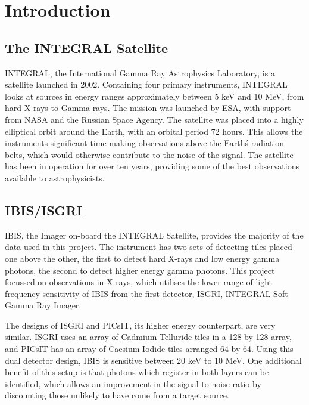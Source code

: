 
\chapter{Introduction} %

\label{ch:introduction} %


\section{The INTEGRAL Satellite}
INTEGRAL, the International Gamma Ray Astrophysics Laboratory, is a satellite launched in 2002. Containing four primary instruments, INTEGRAL looks at sources in energy ranges approximately between 5 keV and 10 MeV, from hard X-rays to Gamma rays. The mission was launched by ESA, with support from NASA and the Russian Space Agency. The satellite was placed into a highly elliptical orbit around the Earth, with an orbital period 72 hours. This allows the instruments significant time making observations above the Earth\'s radiation belts, which would otherwise contribute to the noise of the signal. The satellite has been in operation for over ten years, providing some of the best observations available to astrophysicists\cite{lamport94}.

\section{IBIS/ISGRI}
IBIS, the Imager on-board the INTEGRAL Satellite, provides the majority of the data used in this project. The instrument has two sets of detecting tiles placed one above the other, the first to detect hard X-rays and low energy gamma photons, the second to detect higher energy gamma photons. This project focussed on observations in X-rays, which utilises the lower range of light frequency sensitivity of IBIS from the first detector, ISGRI, INTEGRAL Soft Gamma Ray Imager.

The designs of ISGRI and PICsIT, its higher energy counterpart, are very similar. ISGRI uses an array of Cadmium Telluride tiles in a 128 by 128 array, and PICsIT has an array of Caesium Iodide tiles arranged 64 by 64. Using this dual detector design, IBIS is sensitive between 20 keV to 10 MeV. One additional benefit of this setup is that photons which register in both layers can be identified, which allows an improvement in the signal to noise ratio by discounting those unlikely to have come from a target source.

